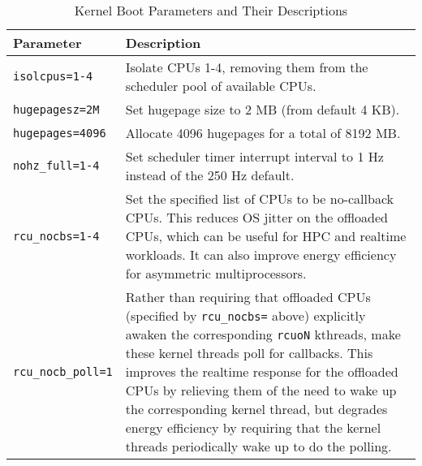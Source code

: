\begin{table}
    \centering
    \caption{Kernel Boot Parameters and Their Descriptions}
    \label{tab:kernel_params_table}
\begin{tabular}{|l|p{10cm}|}
    \hline
    Parameter & Description \\
    \hline \hline
    \texttt{isolcpus=1-4} & Isolate CPUs 1-4, removing them from the scheduler pool of available CPUs. \\ 
    \hline
    \texttt{hugepagesz=2M} & Set hugepage size to 2 MB (from default 4 KB). \\
    \hline
    \texttt{hugepages=4096} & Allocate 4096 hugepages for a total of 8192 MB. \\ 
    \hline
    \texttt{nohz\_full=1-4} & Set scheduler timer interrupt interval to 1 Hz instead of the 250 Hz default. \\ 
    \hline
    \texttt{rcu\_nocbs=1-4} & Set the specified list of CPUs to be no-callback CPUs. This reduces OS jitter on the offloaded CPUs, which can be useful for HPC and realtime workloads. It can also improve energy efficiency for asymmetric multiprocessors. \\ 
    \hline
    \texttt{rcu\_nocb\_poll=1} & Rather than requiring that offloaded CPUs (specified by \texttt{rcu\_nocbs=} above) explicitly awaken the corresponding \texttt{rcuoN} kthreads, make these kernel threads poll for callbacks. This improves the realtime response for the offloaded CPUs by relieving them of the need to wake up the corresponding kernel thread, but degrades energy efficiency by requiring that the kernel threads periodically wake up to do the polling. \\
    \hline
\end{tabular}
\end{table}

